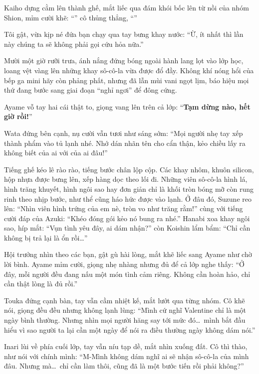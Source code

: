 \documentclass[../main.tex]{subfiles}
\begin{document}
Kaiho dựng cằm lên thành ghế, mắt liếc qua đám khói bốc lên từ nồi của nhóm Shion, mỉm cười khẽ: ``'' cô thủng thẳng, ``''

Tôi gật, vừa kịp né đứa bạn chạy qua tay bưng khay nước: ``Ừ, ít nhất thì lần này chúng ta sẽ không phải gọi cứu hỏa nữa.''

\ct

Mười một giờ rưỡi trưa, ánh nắng đứng bóng ngoài hành lang lọt vào lớp học, loang vệt vàng lên những khay sô-cô-la vừa được đổ đầy. Không khí nóng hổi của bếp ga mini hãy còn phảng phất, nhưng đã lẫn mùi vani ngọt lịm, báo hiệu mọi thứ đang bước sang giai đoạn ``nghỉ ngơi'' để đông cứng.

Ayame vỗ tay hai cái thật to, giọng vang lên trên cả lớp: ``\textbf{Tạm dừng nào, hết giờ rồi!}''

Wata đứng bên cạnh, nụ cười vẫn tươi như sáng sớm: ``Mọi người nhẹ tay xếp thành phẩm vào tủ lạnh nhé. Nhớ dán nhãn tên cho cẩn thận, kẻo chiều lấy ra không biết của ai với của ai đâu!''

Tiếng ghế kéo lê rào rào, tiếng bước chân lộp cộp. Các khay nhôm, khuôn silicon, hộp nhựa được bưng lên, xếp hàng dọc theo lối đi. Những viên sô-cô-la hình lá, hình trăng khuyết, hình ngôi sao hay đơn giản chỉ là khối tròn bóng mỡ còn rung rinh theo nhịp bước, như thể cũng háo hức được vào lạnh. Ở đâu đó, Suzune reo lên: ``Nhìn viên hình trứng của em nè, tròn vo như trăng rằm!'' cùng với tiếng cười đáp của Azuki: ``Khéo đóng gói kẻo nó bung ra nhé.'' Hanabi xoa khay ngôi sao, híp mắt: ``Vụn tình yêu đây, ai dám nhận?'' còn Koishin lẩm bẩm: ``Chỉ cần không bị trả lại là ổn rồi\dots''

Hội trưởng nhìn theo các bạn, gật gù hài lòng, mắt khẽ liếc sang Ayame như chờ lời bình. Ayame mỉm cười, giọng nhẹ nhàng nhưng đủ để cả lớp nghe thấy: ``Ở đây, mỗi người đều đang nấu một món tình cảm riêng. Không cần hoàn hảo, chỉ cần thật lòng là đủ rồi.''

Touka đứng cạnh bàn, tay vẫn cầm nhiệt kế, mắt lướt qua từng nhóm. Cô khẽ nói, giọng đều đều nhưng không lạnh lùng: ``Mình cứ nghĩ Valentine chỉ là một ngày bình thường. Nhưng nhìn mọi người hăng say tới mức đó\dots\ mình bắt đầu hiểu vì sao người ta lại cần một ngày để nói ra điều thường ngày không dám nói.''

Inari lùi về phía cuối lớp, tay vẫn níu tạp dề, mắt nhìn xuống đất. Cô thì thào, như nói với chính mình: ``M-Mình không dám nghĩ ai sẽ nhận sô-cô-la của mình đâu. Nhưng mà\dots\ chỉ cần làm thôi, cũng đã là một bước tiến rồi phải không?''
\end{document}

